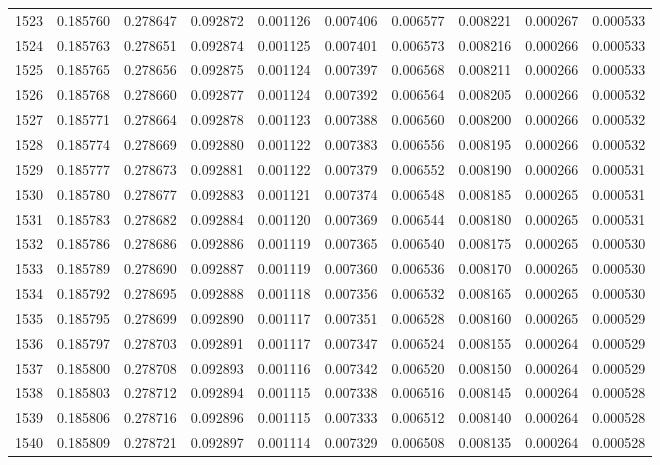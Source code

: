 \begin{tabular}{lrrrrrrrrr}
1523 & 0.185760 & 0.278647 & 0.092872 & 0.001126 & 0.007406 & 0.006577 & 0.008221 & 0.000267 & 0.000533 \\
1524 & 0.185763 & 0.278651 & 0.092874 & 0.001125 & 0.007401 & 0.006573 & 0.008216 & 0.000266 & 0.000533 \\
1525 & 0.185765 & 0.278656 & 0.092875 & 0.001124 & 0.007397 & 0.006568 & 0.008211 & 0.000266 & 0.000533 \\
1526 & 0.185768 & 0.278660 & 0.092877 & 0.001124 & 0.007392 & 0.006564 & 0.008205 & 0.000266 & 0.000532 \\
1527 & 0.185771 & 0.278664 & 0.092878 & 0.001123 & 0.007388 & 0.006560 & 0.008200 & 0.000266 & 0.000532 \\
1528 & 0.185774 & 0.278669 & 0.092880 & 0.001122 & 0.007383 & 0.006556 & 0.008195 & 0.000266 & 0.000532 \\
1529 & 0.185777 & 0.278673 & 0.092881 & 0.001122 & 0.007379 & 0.006552 & 0.008190 & 0.000266 & 0.000531 \\
1530 & 0.185780 & 0.278677 & 0.092883 & 0.001121 & 0.007374 & 0.006548 & 0.008185 & 0.000265 & 0.000531 \\
1531 & 0.185783 & 0.278682 & 0.092884 & 0.001120 & 0.007369 & 0.006544 & 0.008180 & 0.000265 & 0.000531 \\
1532 & 0.185786 & 0.278686 & 0.092886 & 0.001119 & 0.007365 & 0.006540 & 0.008175 & 0.000265 & 0.000530 \\
1533 & 0.185789 & 0.278690 & 0.092887 & 0.001119 & 0.007360 & 0.006536 & 0.008170 & 0.000265 & 0.000530 \\
1534 & 0.185792 & 0.278695 & 0.092888 & 0.001118 & 0.007356 & 0.006532 & 0.008165 & 0.000265 & 0.000530 \\
1535 & 0.185795 & 0.278699 & 0.092890 & 0.001117 & 0.007351 & 0.006528 & 0.008160 & 0.000265 & 0.000529 \\
1536 & 0.185797 & 0.278703 & 0.092891 & 0.001117 & 0.007347 & 0.006524 & 0.008155 & 0.000264 & 0.000529 \\
1537 & 0.185800 & 0.278708 & 0.092893 & 0.001116 & 0.007342 & 0.006520 & 0.008150 & 0.000264 & 0.000529 \\
1538 & 0.185803 & 0.278712 & 0.092894 & 0.001115 & 0.007338 & 0.006516 & 0.008145 & 0.000264 & 0.000528 \\
1539 & 0.185806 & 0.278716 & 0.092896 & 0.001115 & 0.007333 & 0.006512 & 0.008140 & 0.000264 & 0.000528 \\
1540 & 0.185809 & 0.278721 & 0.092897 & 0.001114 & 0.007329 & 0.006508 & 0.008135 & 0.000264 & 0.000528 \\

\end{tabular}
